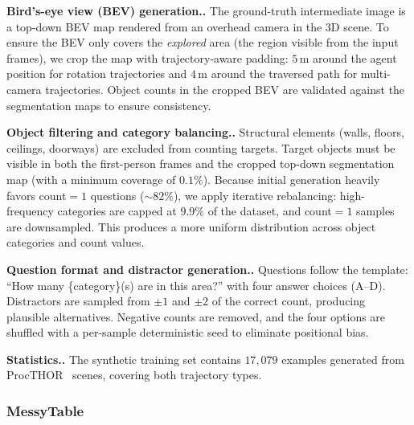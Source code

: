 \documentclass{llmxive}
\providecommand{\paragraph}[1]{\vspace{.5em}\noindent\textbf{#1.}}
\begin{document}
\paragraph{Bird's-eye view (BEV) generation.}
The ground-truth intermediate image is a top-down BEV map rendered from an overhead camera in the 3D scene.
To ensure the BEV only covers the \emph{explored} area (the region visible from the input frames), we crop the map with trajectory-aware padding: $5$\,m around the agent position for rotation trajectories and $4$\,m around the traversed path for multi-camera trajectories.
Object counts in the cropped BEV are validated against the segmentation maps to ensure consistency.

\paragraph{Object filtering and category balancing.}
Structural elements (walls, floors, ceilings, doorways) are excluded from counting targets.
Target objects must be visible in both the first-person frames and the cropped top-down segmentation map (with a minimum coverage of $0.1\%$).
Because initial generation heavily favors count$=1$ questions (${\sim}82\%$), we apply iterative rebalancing: high-frequency categories are capped at $9.9\%$ of the dataset, and count$=1$ samples are downsampled.
This produces a more uniform distribution across object categories and count values.

\paragraph{Question format and distractor generation.}
Questions follow the template: ``How many \{category\}(s) are in this area?'' with four answer choices (A--D).
Distractors are sampled from $\pm1$ and $\pm2$ of the correct count, producing plausible alternatives.
Negative counts are removed, and the four options are shuffled with a per-sample deterministic seed to eliminate positional bias.

\paragraph{Statistics.}
The synthetic training set contains $17{,}079$ examples generated from ProcTHOR~\cite{deitke2022procthor} scenes, covering both trajectory types.

\subsubsection{MessyTable}
\end{document}
